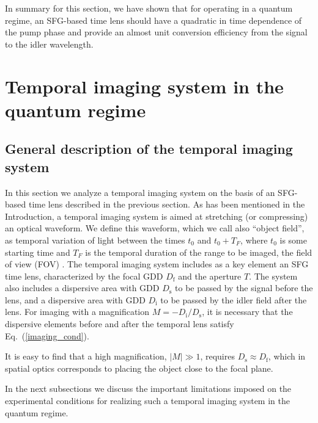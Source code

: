 \documentclass[10pt,twocolumn]{article}
\begin{document}
In summary for this section, we have shown that for operating in a quantum regime, an SFG-based time lens should have a quadratic in time dependence of the pump phase and provide an almost unit conversion efficiency from the signal to the idler wavelength.


\section{Temporal imaging system in the quantum regime}

\subsection{General description of the temporal imaging system}
In this section we analyze a temporal imaging system on the basis of an SFG-based time lens described in the previous section. As has been mentioned in the Introduction, a temporal imaging system is aimed at stretching (or compressing) an optical waveform. We define this waveform, which we call also ``object field'', as temporal variation of light between the times $t_0$ and $t_0+T_{F}$, where $t_0$ is some starting time and  $T_{F}$ is the temporal duration of the range to be imaged, the field of view (FOV) \cite{Bennett2000a,Bennett2000b}. The temporal imaging system includes as a key element an SFG time lens, characterized by the focal GDD $D_{\mathrm{f}}$ and the aperture $T$. The system also includes a dispersive area with GDD $D_{\mathrm{s}}$ to be passed by the signal before the lens, and a dispersive area with GDD $D_{\mathrm{i}}$ to be passed by the idler field after the lens. For imaging with a magnification $M=-D_{\mathrm{i}}/D_{\mathrm{s}}$, it is necessary that the dispersive elements before and after the temporal lens satisfy Eq.~(\ref{imaging_cond}).

It is easy to find that a high magnification, $|M|\gg 1$, requires $D_{\mathrm{s}}\approx D_{\mathrm{f}}$, which in spatial optics corresponds to placing the object close to the focal plane.

In the next subsections we discuss the important limitations imposed on the experimental conditions for realizing such a temporal imaging system in the quantum regime.
\end{document}
